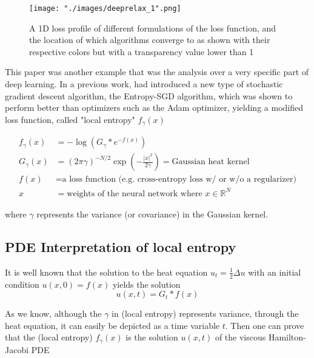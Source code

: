 \begin{figure}[ht]
\begin{center}
    \texttt{[image: "./images/deeprelax\_1".png]}
    \caption{A 1D loss profile of different formulations of the loss function, and the location of which algorithms converge to as shown with their respective colors but with a transparency value lower than 1 }
    \label{fig::deeprelax_1}
\end{center}
\end{figure}

This paper was another example that was the analysis over a very specific part of deep learning. In a previous work, \cite{entropySGD} had introduced a new type of stochastic gradient descent algorithm, the Entropy-SGD algorithm, which was shown to perform better than optimizers such as the Adam optimizer, yielding a modified loss function, called "local entropy" $f_\gamma(x)$

\begin{align*}
    f_\gamma(x) &= -\log \left( G_\gamma * e^{-f(x)}\right) \tag{local entropy} \\
    G_\gamma (x) &= (2\pi \gamma)^{-N/2} \exp\left( -\frac{|x|^2}{2\gamma}\right) = \text{Gaussian heat kernel}  \\
    f(x) &= \text{a loss function (e.g. cross-entropy loss w/ or w/o a regularizer)} \\
    x &= \text{weights of the neural network where } x \in \mathbb{R}^N
\end{align*}

where $\gamma$ represents the variance (or covariance) in the Gaussian kernel.

\subsection{PDE Interpretation of local entropy}

It is well known that the solution to the heat equation $u_t = \frac{1}{2} \Delta u$ with an initial condition $u(x,0) = f(x)$ yields the solution
$$u(x,t) = G_t * f(x)$$

As we know, although the $\gamma$ in (local entropy) represents variance, through the heat equation, it can easily be depicted as a time variable $t$. Then one can prove that the (local entropy) $f_\gamma(x)$ is the solution $u(x,t)$ of the viscous Hamilton-Jacobi PDE

